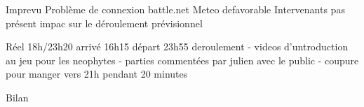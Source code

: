                 Imprevu
                   Problème de connexion battle.net
                   Meteo defavorable
                   Intervenants pas présent
                   impac sur le déroulement prévisionnel

                Réel
                    18h/23h20
                    arrivé 16h15
                    départ 23h55
                    deroulement
                        - videos d'untroduction au jeu pour les neophytes
                        - parties commentées par julien avec le public
                        - coupure pour manger vers 21h pendant 20 minutes

Bilan

